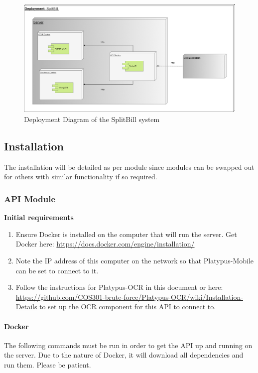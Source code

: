 \documentclass[12pt,a4paper]{article}
\begin{document}
\begin{figure}[h]
\includegraphics[width= \textwidth]{Deployment.png}
\caption{Deployment Diagram of the SplitBill system}
\centering
\end{figure}
       
    \subsection{Installation}
    The installation will be detailed as per module since modules can be swapped out for others with similar functionality if so required. 
    \subsubsection{API Module}
    \textbf{Initial requirements}
     	\begin{enumerate}
     	\item Ensure Docker is installed on the computer that will run the server. Get Docker here: \url{https://docs.docker.com/engine/installation/} 
        
        \item Note the IP address of this computer on the network so that Platypus-Mobile can be set to connect to it.
        
        \item Follow the instructions for Platypus-OCR in this document or  here: \url{https://github.com/COS301-brute-force/Platypus-OCR/wiki/Installation-Details} to set up the OCR component for this API to connect to.
     	\end{enumerate}
        
	\paragraph{Docker}
	The following commands must be run in order to get the API up and running on the server. Due to the nature of Docker, it will download all dependencies and run them. Please be patient.
    \vspace{1cm}
 
\end{document}
